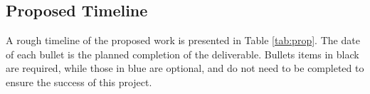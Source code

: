 
\subsection{Proposed Timeline}

%
%
A rough timeline of the proposed work is presented in Table
\ref{tab:prop}. The date of each bullet is the planned completion of the
deliverable. Bullets items in black are required, while those in blue
are optional, and do not need to be completed to ensure the
success of this project. 

% 
% 

